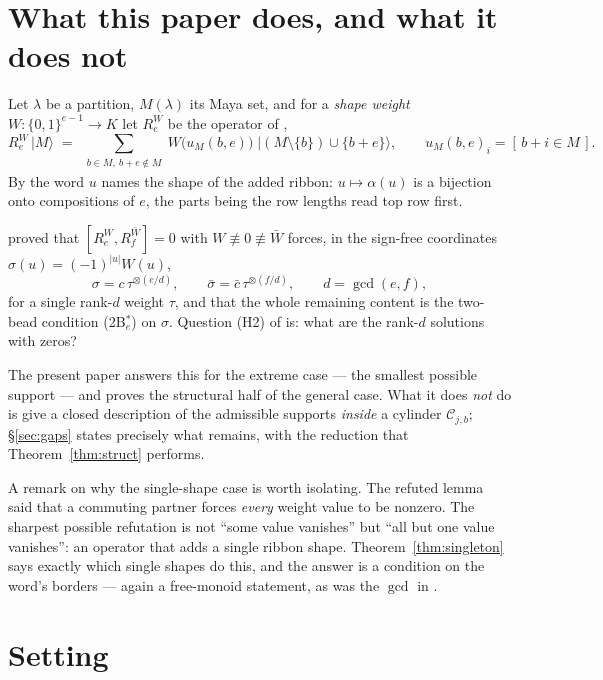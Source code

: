 \documentclass[11pt]{article}
\theoremstyle{definition}
\theoremstyle{remark}
\newcommand{\Cset}{\mathcal{C}}
\newcommand{\cube}{\{0,1\}}
\begin{document}
\tableofcontents

\section{What this paper does, and what it does not}

Let $\lambda$ be a partition, $M(\lambda)$ its Maya set, and for a \emph{shape weight}
$W:\cube^{e-1}\to K$ let $R_e^{W}$ be the operator of \cite[Conv.~1.2]{Q149},
\[
   R_e^{W}\,|M\rangle \;=\; \sum_{\substack{b\in M,\ b+e\notin M}}
       W\bigl(u_M(b,e)\bigr)\;\bigl|(M\setminus\{b\})\cup\{b+e\}\bigr\rangle ,
   \qquad u_M(b,e)_i=[\,b+i\in M\,].
\]
By \cite[Lemma 1.3]{Q149} the word $u$ names the shape of the added ribbon: $u\mapsto\alpha(u)$
is a bijection onto compositions of $e$, the parts being the row lengths read top row first.

\cite{Q150c1} proved that $[R_e^{W},R_f^{\bar W}]=0$ with $W\not\equiv0\not\equiv\bar W$ forces,
in the sign-free coordinates $\sigma(u)=(-1)^{|u|}W(u)$,
\[
   \sigma=c\,\tau^{\otimes(e/d)},\qquad \bar\sigma=\bar c\,\tau^{\otimes(f/d)},\qquad d=\gcd(e,f),
\]
for a single rank-$d$ weight $\tau$, and that the whole remaining content is the two-bead
condition \textnormal{(2B$^*_e$)} on $\sigma$.  Question (H2) of \cite[\S8]{Q150c1} is: what are
the rank-$d$ solutions with zeros?

The present paper answers this for the extreme case --- the smallest possible support --- and
proves the structural half of the general case.  What it does \emph{not} do is give a closed
description of the admissible supports \emph{inside} a cylinder $\Cset_{j,b}$; \S\ref{sec:gaps}
states precisely what remains, with the reduction that Theorem~\ref{thm:struct} performs.

A remark on why the single-shape case is worth isolating.  The refuted lemma
\cite[Lemma 8.2]{Q149} said that a commuting partner forces \emph{every} weight value to be
nonzero.  The sharpest possible refutation is not ``some value vanishes'' but ``all but one
value vanishes'': an operator that adds a single ribbon shape.  Theorem~\ref{thm:singleton}
says exactly which single shapes do this, and the answer is a condition on the word's borders
--- again a free-monoid statement, as was the $\gcd$ in \cite[Thm.~1.2]{Q150c1}.

\section{Setting}\label{sec:setup}
\end{document}
